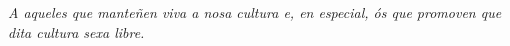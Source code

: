 \thispagestyle{empty}
\mbox{}\vfill\hfill
\emph{A aqueles que manteñen viva a nosa cultura e, en especial, ós que promoven que dita cultura sexa libre.}
\vfill
